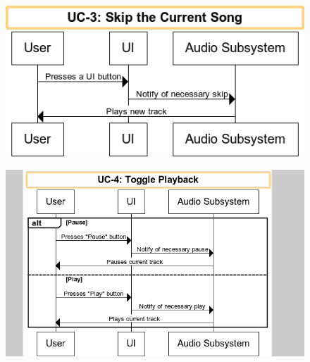 \documentclass[letterpaper,english, 12pt]{scrreprt}
\begin{document}
\begin{figure}[H]
        \centering
        \includegraphics[width=\textwidth]{img/ssd/ssd_uc3.png}\\
\end{figure}

\begin{figure}[H]
        \centering
        \includegraphics[width=\textwidth]{img/ssd/ssd_uc4.png}\\
\end{figure}
\end{document}
